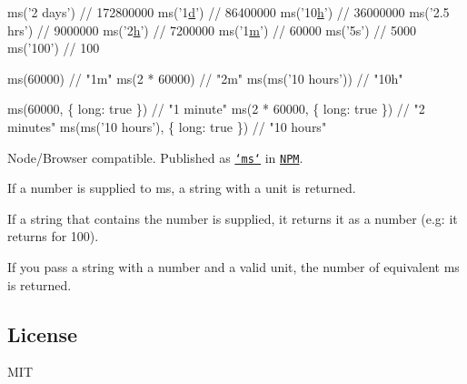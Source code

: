 
\begin{DoxyCode}
ms(\textcolor{stringliteral}{'2 days'})  \textcolor{comment}{// 172800000}
ms('1\hyperlink{058__bracket__recursion_8tcl_af43f4b1f0064a33b2d662af9f06d3a00}{d}')      \textcolor{comment}{// 86400000}
ms('10\hyperlink{058__bracket__recursion_8tcl_af96fd0966e32a310a0778d2e5c357700}{h}')     \textcolor{comment}{// 36000000}
ms('2.5 hrs') \textcolor{comment}{// 9000000}
ms('2\hyperlink{058__bracket__recursion_8tcl_af96fd0966e32a310a0778d2e5c357700}{h}')      \textcolor{comment}{// 7200000}
ms('1\hyperlink{058__bracket__recursion_8tcl_a78d127e8bda64d4471ac811ad512fbd9}{m}')      \textcolor{comment}{// 60000}
ms('5s')      \textcolor{comment}{// 5000}
ms('100')     \textcolor{comment}{// 100}
\end{DoxyCode}



\begin{DoxyCode}
ms(60000)             \textcolor{comment}{// "1m"}
ms(2 * 60000)         \textcolor{comment}{// "2m"}
ms(ms('10 hours'))    \textcolor{comment}{// "10h"}
\end{DoxyCode}



\begin{DoxyCode}
ms(60000, \{ \textcolor{keywordtype}{long}: \textcolor{keyword}{true} \})             \textcolor{comment}{// "1 minute"}
ms(2 * 60000, \{ \textcolor{keywordtype}{long}: \textcolor{keyword}{true} \})         \textcolor{comment}{// "2 minutes"}
ms(ms(\textcolor{stringliteral}{'10 hours'}), \{ \textcolor{keywordtype}{long}: \textcolor{keyword}{true} \})    \textcolor{comment}{// "10 hours"}
\end{DoxyCode}



\begin{DoxyItemize}
\item Node/\+Browser compatible. Published as \href{https://www.npmjs.org/package/ms}{\tt `ms`} in \href{nodejs.org/download}{\tt N\+P\+M}.
\item If a number is supplied to {\ttfamily ms}, a string with a unit is returned.
\item If a string that contains the number is supplied, it returns it as a number (e.\+g\+: it returns {} for {\ttfamily \textquotesingle{}100\textquotesingle{}}).
\item If you pass a string with a number and a valid unit, the number of equivalent ms is returned.
\end{DoxyItemize}

\subsection*{License}

M\+I\+T 